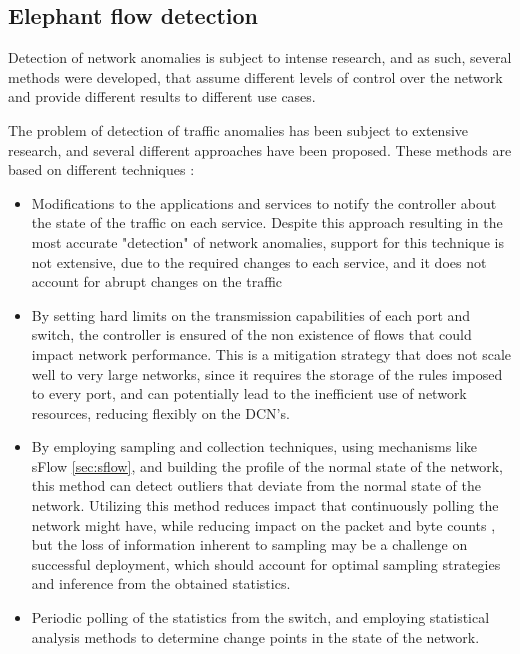 \subsection {Elephant flow detection}

Detection of network anomalies is subject to intense research, and as such, several methods were developed, that assume different levels of control over the network 
and provide different results to different use cases.

\par The problem of detection of traffic anomalies has been subject to extensive research, and several different approaches have been proposed. These methods are
based on different techniques \cite {http://shiftleft.com/mirrors/www.hpl.hp.com/personal/Praveen_Yalagandula/papers/INFOCOM11.pdf}:

\begin {itemize}
    \item Modifications to the applications and services to notify the controller about the state of the traffic on each service. Despite this approach resulting
         in the most accurate "detection" of network anomalies, support for this technique is not extensive, due to the required changes to each service, 
         and it does not account for abrupt changes on the traffic
    \item By setting hard limits on the transmission capabilities of each port and switch, the controller is ensured of the non existence of flows that could 
        impact network performance. This is a mitigation strategy that does not scale well to very large networks, since it requires the storage of the rules
        imposed to every port, and can potentially lead to the inefficient use of network resources, reducing flexibly on the DCN's.
    \item By employing sampling and collection techniques, using mechanisms like sFlow \ref{sec:sflow}, and building the profile of the normal state of the network,
        this method can detect outliers that deviate from the normal state of the network. Utilizing this method reduces impact that continuously polling the network
        might have, while reducing impact on the packet and byte counts \cite {https://www.cert.org/flocon/2006/presentations/packet_sample_anomoly2006.pdf}, but 
        the loss of information inherent to sampling may be a challenge on successful deployment, which should account for optimal sampling 
        strategies and inference from the obtained statistics.
    \item Periodic polling of the statistics from the switch, and employing statistical analysis methods to determine change points in the state of the network.
\end {itemize}



